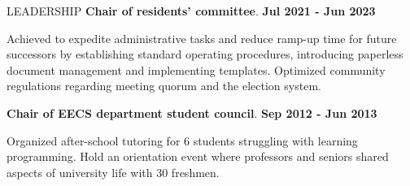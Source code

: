 \documentclass{resume} %
\begin{document}

\begin{rSection}{LEADERSHIP}
\textbf{Chair of residents’ committee}. \hfill \textbf{Jul 2021 - Jun 2023}
\begin{outline}
  \1 Achieved to expedite administrative tasks and reduce ramp-up time for
  future successors by establishing standard operating procedures, introducing
  paperless document management and implementing templates.
  \1 Optimized community regulations regarding meeting quorum and the election
  system.
\end{outline}

\textbf{Chair of EECS department student council}. \hfill \textbf{Sep 2012 - Jun 2013}
\begin{outline}
  \1 Organized after-school tutoring for 6 students struggling with learning programming.
  \1 Hold an orientation event where professors and seniors shared aspects
  of university life with 30 freshmen.
\end{outline}
\end{rSection} %
\end{document}
